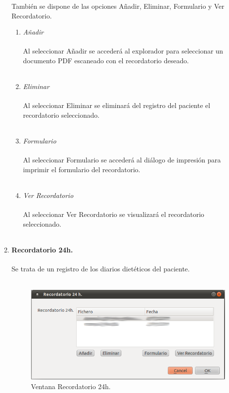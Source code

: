 \begin{enumerate}
También se dispone de las opciones Añadir, Eliminar, Formulario y Ver Recordatorio.
\begin{enumerate}
\item \textit{Añadir}\\\\
Al seleccionar Añadir se accederá al explorador para seleccionar un documento PDF escaneado con el recordatorio deseado.\\\\
\item \textit{Eliminar}\\\\
Al seleccionar Eliminar se eliminará del registro del paciente el recordatorio seleccionado.\\\\
\item \textit{Formulario}\\\\
Al seleccionar Formulario se accederá al diálogo de impresión para imprimir el formulario del recordatorio.\\\\
\item \textit{Ver Recordatorio}\\\\
Al seleccionar Ver Recordatorio se visualizará el recordatorio seleccionado.\\\\
\end{enumerate}
\item \textbf{Recordatorio 24h.}\\\\
Se trata de un registro de los diarios dietéticos del paciente.\\\\
\begin{figure}[H]
  \label{recordatorio}
  \begin{center}
    \includegraphics[scale=0.5]{../../Image/recordatorio.png}
  \end{center}
  \caption{Ventana Recordatorio 24h.}
\end{figure}


\end{enumerate}
